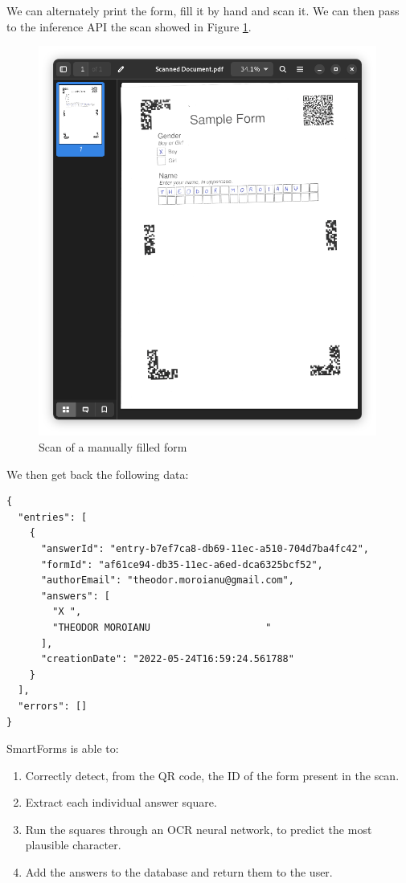 \documentclass[11pt, a4paper]{report}
\begin{document}
We can alternately print the form, fill it by hand and scan it. We can then pass to the inference API the scan showed in Figure \ref{scan-of-filled-form}.

\begin{figure}[!h]
    \centering
    \includegraphics[width=30em]{images/screenshoots/sample_form_scan.png}
    \caption{Scan of a manually filled form}
    \label{scan-of-filled-form}
\end{figure}


We then get back the following data:

\begin{verbatim}
{
  "entries": [
    {
      "answerId": "entry-b7ef7ca8-db69-11ec-a510-704d7ba4fc42",
      "formId": "af61ce94-db35-11ec-a6ed-dca6325bcf52",
      "authorEmail": "theodor.moroianu@gmail.com",
      "answers": [
        "X ",
        "THEODOR MOROIANU                    "
      ],
      "creationDate": "2022-05-24T16:59:24.561788"
    }
  ],
  "errors": []
}
\end{verbatim}

SmartForms is able to:
\begin{enumerate}
    \item Correctly detect, from the QR code, the ID of the form present in the scan.
    \item Extract each individual answer square.
    \item Run the squares through an OCR neural network, to predict the most plausible character.
    \item Add the answers to the database and return them to the user.
\end{enumerate}
\end{document}
